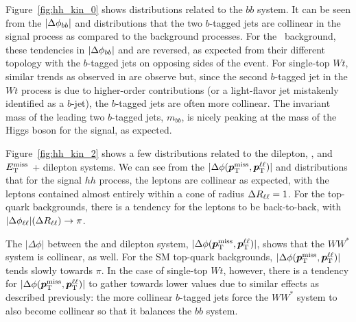 Figure~\ref{fig:hh_kin_0} shows distributions related to the $bb$ system.
It can be seen from the $|\Delta \phi_{bb}|$ and \drbb distributions that the two $b$-tagged jets
are collinear in the signal process as compared to the background processes.
For the \ttbar~background, these tendencies in $|\Delta \phi_{bb}|$ and \drbb are reversed,
as expected from their different topology with the $b$-tagged jets on opposing sides of the event.
For single-top $Wt$, similar trends as observed in \ttbar are observe but, since the second $b$-tagged
jet in the $Wt$ process is due to higher-order contributions (or a light-flavor jet mistakenly identified as a $b$-jet),
the $b$-tagged jets are often more collinear.
The invariant mass of the leading two $b$-tagged jets, $m_{bb}$, is nicely peaking at the mass of the Higgs
boson for the signal, as expected.


Figure~\ref{fig:hh_kin_2} shows a few distributions related to the dilepton, \met, and $E_{\text{T}}^{\text{miss}}$ + dilepton systems.
We can see from the $|\Delta \phi (\bm{p}_{\text{T}}^{\text{miss}}, \bm{p}_{\text{T}}^{\ell\ell})|$ and \drll distributions that for the signal $hh$ process, the leptons
are collinear as expected, with the leptons contained almost entirely within a cone of radius $\Delta R_{\ell\ell} = 1$.
For the top-quark backgrounds, there is a tendency for the leptons to be back-to-back, with $|\Delta \phi_{\ell\ell}| (\Delta R_{\ell\ell}) \rightarrow \pi$.

The $|\Delta \phi|$ between the \met and dilepton system, $|\Delta \phi (\bm{p}_{\text{T}}^{\text{miss}}, \bm{p}_{\text{T}}^{\ell\ell})|$, shows that the $WW^*$ system is collinear, as well.
For the SM top-quark backgrounds, $|\Delta \phi (\bm{p}_{\text{T}}^{\text{miss}}, \bm{p}_{\text{T}}^{\ell\ell})|$ tends slowly towards $\pi$.
In the case of single-top $Wt$, however, there is a tendency for $|\Delta \phi (\bm{p}_{\text{T}}^{\text{miss}}, \bm{p}_{\text{T}}^{\ell\ell})|$ to gather towards lower values due
to similar effects as described previously: the more collinear $b$-tagged jets force the
$WW^*$ system to also become collinear so that it balances the $bb$ system.

